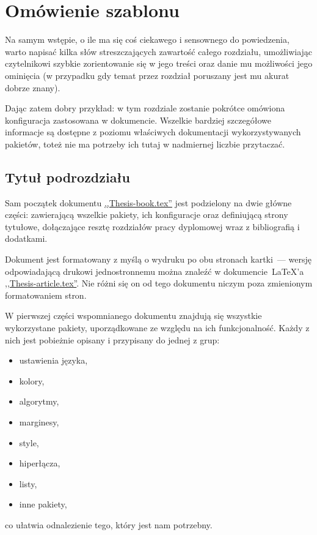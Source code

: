 \chapter{Omówienie szablonu}
\thispagestyle{chapterBeginStyle}





Na samym wstępie, o ile ma się coś ciekawego i sensownego do powiedzenia, warto napisać kilka słów streszczających zawartość całego rozdziału, umożliwiając czytelnikowi szybkie zorientowanie się w jego treści oraz danie mu możliwości jego ominięcia (w przypadku gdy temat przez rozdział poruszany jest mu akurat dobrze znany).

Dając zatem dobry przykład: w tym rozdziale zostanie pokrótce omówiona konfiguracja zastosowana w dokumencie.
Wszelkie bardziej szczegółowe informacje są dostępne z poziomu właściwych dokumentacji wykorzystywanych pakietów, toteż nie ma potrzeby ich tutaj w nadmiernej liczbie przytaczać.




\section{Tytuł podrozdziału}




Sam początek dokumentu \href{Thesis-book.tex}{,,Thesis-book.tex''} jest podzielony na dwie główne części: zawierającą wszelkie pakiety, ich konfiguracje oraz definiującą strony tytułowe, dołączające resztę rozdziałów pracy dyplomowej wraz z bibliografią i dodatkami.

Dokument jest formatowany z myślą o wydruku po obu stronach kartki~--- wersję odpowiadającą drukowi jednostronnemu można znaleźć w dokumencie~\LaTeX'a \href{Thesis-article.tex}{,,Thesis-article.tex''}.
Nie różni się on od tego dokumentu niczym poza zmienionym formatowaniem stron.

W pierwszej części wspomnianego dokumentu znajdują się wszystkie wykorzystane pakiety, uporządkowane ze względu na ich funkcjonalność.
Każdy z nich jest pobieżnie opisany i przypisany do jednej z grup:

\begin{itemize}
	\item ustawienia języka,
	\item kolory,
	\item algorytmy,
	\item marginesy,
	\item style,
	\item hiperłącza,
	\item listy,
	\item inne pakiety,
\end{itemize}
co ułatwia odnalezienie tego, który jest nam potrzebny.

